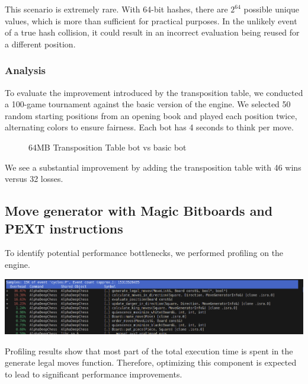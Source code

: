 \vspace{1em}

\noindent This scenario is extremely rare. With 64-bit hashes, there are $2^{64}$ possible unique values, which is more than sufficient for practical purposes. In the unlikely event of a true hash collision, it could result in an incorrect evaluation being reused for a different position.

\subsubsection{Analysis}

To evaluate the improvement introduced by the transposition table, we conducted a 100-game tournament against the basic version of the engine. We selected 50 random starting positions from an opening book and played each position twice, alternating colors to ensure fairness. Each bot has 4 seconds to think per move.

\begin{center}
\begin{figure}[H]
    \centering
    \caption{64MB Transposition Table bot vs basic bot}
    \label{fig:results_transposition_table_bot}
\end{figure}
\medskip
\end{center}

\noindent We see a substantial improvement by adding the transposition table with 46 wins versus 32 losses.

\subsection{Move generator with Magic Bitboards and PEXT instructions}

To identify potential performance bottlenecks, we performed profiling on the engine.

\begin{center}
    \includegraphics[width=1.0\textwidth]{Imagenes/basic_move_generator_profiling.png}
\end{center}

\noindent Profiling results show that most part of the total execution time is spent in the generate legal moves function. Therefore, optimizing this component is expected to lead to significant performance improvements.

